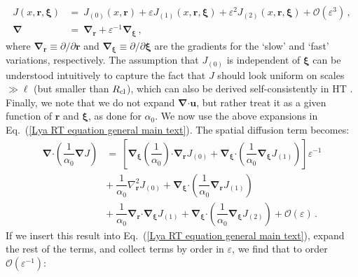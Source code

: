 \documentclass[fleqn,usenatbib]{mnras}
\begin{document}
\begin{align}
    J(x,\boldsymbol{r}, \boldsymbol{\xi}) &=~ J_{(0)}(x,\boldsymbol{r}) + \varepsilon J_{(1)}(x,\boldsymbol{r}, \boldsymbol{\xi}) + \varepsilon^2 J_{(2)}(x,\boldsymbol{r}, \boldsymbol{\xi}) + \mathcal{O}(\varepsilon^3) \, , \nonumber \\ \boldsymbol{\nabla} &=~ \boldsymbol{\nabla}_{\boldsymbol{r}} + \varepsilon^{-1} \boldsymbol{\nabla}_{\boldsymbol{\xi}} \, ,
\end{align}
where $\boldsymbol{\nabla}_{\boldsymbol{r}} \equiv \partial/\partial\boldsymbol{r}$ and $\boldsymbol{\nabla}_{\boldsymbol{\xi}} \equiv \partial/\partial\boldsymbol{\xi}$ are the gradients for the `slow' and `fast' variations, respectively. The assumption that $J_{(0)}$ is independent of $\boldsymbol{\xi}$ can be understood intuitively to capture the fact that $J$ should look uniform on scales $\gg \ell$ (but smaller than $R_{\rm cl}$), which can also be derived self-consistently in HT \citep[e.g.][]{Zwillinger1992_Diffeqs, Holmes2013_Perturbation}. Finally, we note that we do not expand $\boldsymbol{\nabla} \boldsymbol{\cdot} \boldsymbol{u}$, but rather treat it as a given function of $\boldsymbol{r}$ and $\boldsymbol{\xi}$, as done for $\alpha_0$. We now use the above expansions in Eq.~(\ref{Lya RT equation general main text}). The spatial diffusion term becomes:
\begin{align}
    \boldsymbol{\nabla} \boldsymbol{\cdot} \left( \dfrac{1}{\alpha_0}  \boldsymbol{\nabla} J  \right) &=~ \left[ \boldsymbol{\nabla}_{\boldsymbol{\xi}} \left( \dfrac{1}{\alpha_0} \right)  \boldsymbol{\cdot}  \boldsymbol{\nabla}_{\boldsymbol{r}} J_{(0)} + \boldsymbol{\nabla}_{\boldsymbol{\xi}} \boldsymbol{\cdot} \left( \dfrac{1}{\alpha_0} \boldsymbol{\nabla}_{\boldsymbol{\xi}} J_{(1)}\right) \right] \varepsilon^{-1} \nonumber \\ &+~  \dfrac{1}{\alpha_0} \nabla_{\boldsymbol{r}}^{2}J_{(0)} + \boldsymbol{\nabla}_{\boldsymbol{\xi}} \boldsymbol{\cdot} \left( \dfrac{1}{\alpha_0}   \boldsymbol{\nabla}_{\boldsymbol{r}}J_{(1)} \right) \label{diffusion operator 1} \\ &+~ \dfrac{1}{\alpha_0} \boldsymbol{\nabla}_{\boldsymbol{r}} \boldsymbol{\cdot} \boldsymbol{\nabla}_{\boldsymbol{\xi}}  J_{(1)} + \boldsymbol{\nabla}_{\boldsymbol{\xi}} \boldsymbol{\cdot} \left( \dfrac{1}{\alpha_0} \boldsymbol{\nabla}_{\boldsymbol{\xi}} J_{(2)} \right) + \mathcal{O}(\varepsilon) \, \nonumber.
\end{align}
If we insert this result into Eq.~(\ref{Lya RT equation general main text}), expand the rest of the terms, and collect terms by order in $\varepsilon$, we find that to order $\mathcal{O}(\varepsilon^{-1})$:
\end{document}
